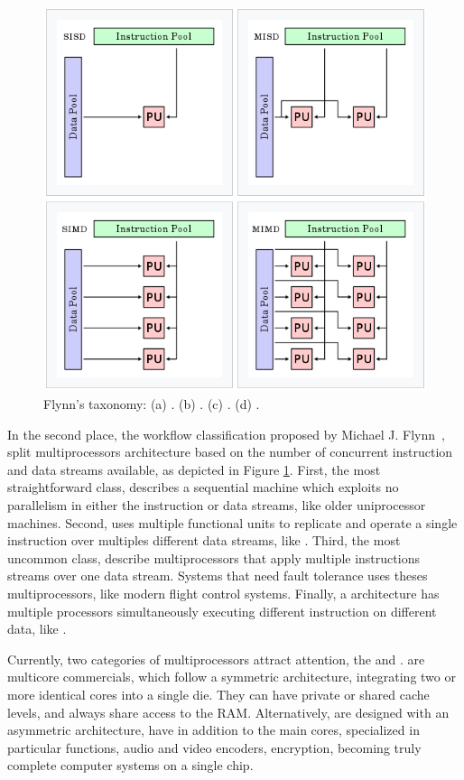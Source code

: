 			\begin{figure}[h]
				\centering
				\includegraphics[width=.6\textwidth]{images/flynn.png}

				\caption{
					Flynn's taxonomy:
					(a) \sisd.
					(b) \simd.
					(c) \misd.
					(d) \mimd.
				}\par
				\label{fig.flynn}
			\end{figure}

			In the second place, the workflow classification proposed by Michael J. Flynn~\cite{flynn:1972},
			split multiprocessors architecture based on the number of concurrent
			instruction and data streams available, as depicted in Figure \ref{fig.flynn}.
			First, the most straightforward class, \sisd describes a sequential
			machine which exploits no parallelism in either the instruction or
			data streams, like older uniprocessor machines.
			Second, \simd uses multiple functional units to replicate and operate
			a single instruction over multiples different data streams, like \gpu.
			Third, the most uncommon class, \misd describe multiprocessors that
			apply multiple instructions streams over one data stream.
			Systems that need fault tolerance uses theses multiprocessors, like
			modern flight control systems.
			Finally, a \mimd architecture has multiple processors simultaneously
			executing different instruction on different data, like \xeonphi.

			Currently, two categories of multiprocessors attract attention, the \cmp and \soc.
			\cmps are multicore commercials, which follow a symmetric architecture,
			integrating two or more identical cores into a single die.
			They can have private or shared cache levels, and always share access
			to the RAM.
			Alternatively, \socs are designed with an asymmetric architecture,
			have in addition to the main cores, specialized \cpus in particular
			functions, \eg audio and video encoders, encryption, becoming truly
			complete computer systems on a single chip.

